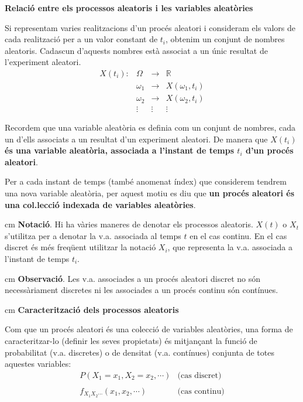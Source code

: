 \documentclass{article}
\newcommand\R{\mathbb{R}}
\begin{document}
\textbf{\Large Relaci\'o entre els processos aleatoris i les variables aleat\`ories}

Si representam varies realitzacions d'un proc\'es aleatori i consideram els 
valors de cada realitzaci\'o per a un valor constant de $t_i$, obtenim un conjunt de
nombres aleatoris. Cadascun d'aquests nombres est\`a associat a un \'unic resultat de
l'experiment aleatori. 
\[
\begin{array}{rccc}
X(t_i): & \Omega & \longrightarrow  & \R\\
   & \omega_1 & \rightarrow & X(\omega_1, t_i) \\
   & \omega_2 & \rightarrow & X(\omega_2, t_i) \\
   & \vdots   & \vdots      &   \vdots 
\end{array}
\]

Recordem que una variable aleat\`oria es definia com un conjunt de nombres, cada un d'ells
associats a un resultat d'un experiment aleatori. De manera que 
\textbf{$X(t_i)$ \'es una variable aleat\`oria, associada a l'instant de temps $t_i$ 
d'un proc\'es aleatori}. 

Per a cada instant de temps (tamb\'e anomenat \'index) que considerem tendrem una 
nova variable aleat\`oria, per aquest motiu es diu que \textbf{un proc\'es aleatori 
\'es una col.lecci\'o indexada de variables aleat\`ories}.

 cm
\textbf{Notaci\'o}. Hi ha v\`aries maneres de denotar els processos aleatoris.
$X(t)$ o $X_{t}$ s'utilitza per a denotar la v.a. associada al temps $t$ en el 
cas continu. En el cas discret \'es m\'es freq\"uent utilitzar la notaci\'o 
$X_i$, que representa la v.a. associada a l'instant de temps $t_i$.

 cm
\textbf{Observaci\'o}. Les v.a. associades a un proc\'es aleatori discret no s\'on
necess\`ariament discretes ni les associades a un proc\'es continu s\'on cont\'inues.



 cm
\textbf{\Large Caracteritzaci\'o dels processos aleatoris}

Com que un proc\'es aleatori \'es una colecci\'o de variables aleat\`ories, una
forma de caracteritzar-lo (definir les seves propietats) \'es mitjan\c{c}ant
la funci\'o de probabilitat (v.a. discretes) o de densitat (v.a. cont\'inues) conjunta
de totes aquestes variables:
\[
\begin{array}{ll}
P(X_1=x_1, X_2=x_2, \cdots) & \text{(cas discret)} \\ \\
f_{X_1 X_2 \cdots}(x_1, x_2, \cdots) & \text{(cas continu)}
\end{array}
\]
\end{document}
